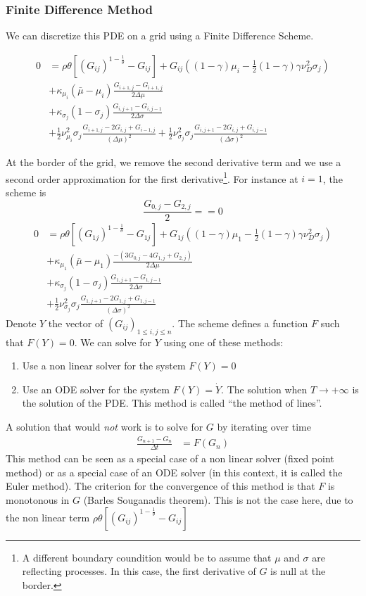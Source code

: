 \documentclass[english]{article}
\begin{document}
\subsubsection{Finite Difference Method}
We can discretize this PDE on a grid using a Finite Difference Scheme. 

\begin{align*}
	0&= \rho \theta[(G_{ij})^{1-\frac{1}{\theta}}- G_{ij}]+G_{ij}((1-\gamma)\mu_i-\frac{1}{2}(1-\gamma)\gamma\nu_D^2\sigma_j)\\
	&+\kappa_{\mu_i}(\bar{\mu}-\mu_i)\frac{G_{i+1, j}-G_{i+1, j}}{2\Delta \mu}\\
	&+\kappa_{\sigma_j}(1-\sigma_j)\frac{G_{i, j+1}-G_{i,j-1}}{2\Delta \sigma}\\
	&+\frac{1}{2}\nu_{\mu_i}^{2}\sigma_j\frac{G_{i+1, j} - 2 G_{i, j} + G_{i-1, j}}{(\Delta\mu)^2}+\frac{1}{2}\nu_{\sigma_j}^{2}\sigma_j\frac{G_{i, j+1} - 2 G_{i, j} + G_{i, j-1}}{(\Delta\sigma)^2}
\end{align*}


At the border of the grid, we remove the second derivative term and we use a second order approximation for the first derivative\footnote{A different boundary coundition would be to assume that $\mu$ and $\sigma$ are reflecting processes. In this case, the first derivative of $G$ is null at the border.}. For instance at $i = 1$, the scheme is 
$$\frac{G_{0, j}-G_{2,j}}{2} == 0$$
\begin{align*}
	0&= \rho \theta[(G_{1j})^{1-\frac{1}{\theta}}- G_{1j}]+G_{1j}((1-\gamma)\mu_1-\frac{1}{2}(1-\gamma)\gamma\nu_D^2\sigma_j)\\
	&+\kappa_{\mu_1}(\bar{\mu}-\mu_1)\frac{-(3G_{0,j} - 4 G_{1,j} + G_{2,j})}{2\Delta \mu}\\
	&+\kappa_{\sigma_j}(1-\sigma_j)\frac{G_{1, j+1}-G_{1,j-1}}{2\Delta \sigma}\\
	&+\frac{1}{2}\nu_{\sigma_j}^{2}\sigma_j\frac{G_{1, j+1} - 2 G_{1, j} + G_{1, j-1}}{(\Delta\sigma)^2}
\end{align*}
Denote $Y$ the vector of  $(G_{ij})_{1 \leq i,j\leq n}$. The scheme  defines a function $F$ such that $F(Y) = 0$. We can solve for $Y$ using one of these methods:
\begin{enumerate}
	\item Use a non linear solver for the system $F(Y) = 0$
	\item Use an ODE solver for the system $F(Y) = \dot{Y}$. The solution when $T\rightarrow +\infty$ is the solution of the PDE. This method is called ``the method of lines''.
\end{enumerate}
A solution that would \textit{not} work is to solve for $G$ by iterating over time
\begin{align*}
	\frac{G_{n+1}-G_n}{\Delta t} &= F(G_n)
\end{align*}
This method can be seen as a special case of a non linear solver (fixed point method) or as a special case of an ODE solver (in this context, it is called the Euler method). The criterion for the convergence of this method is that $F$ is monotonous in $G$ (Barles Souganadis theorem). This is not the case here, due to the non linear term  $\rho \theta[(G_{ij})^{1-\frac{1}{\theta}}- G_{ij}]$
\end{document}
